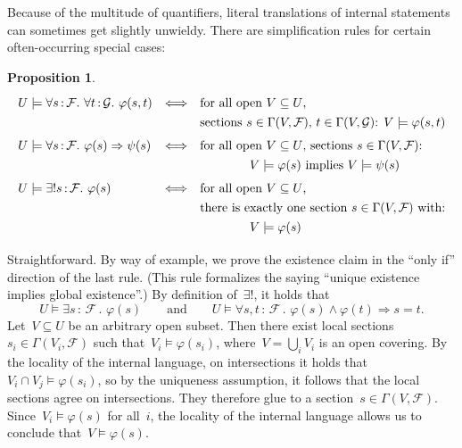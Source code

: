 \documentclass[10pt,reqno,a4paper]{amsbook}
\makeatletter
\theoremstyle{definition}
\theoremstyle{plain}
\newtheorem{prop}[defn]{Proposition}
\theoremstyle{remark}
\newcommand{\F}{\mathcal{F}}
\newcommand{\G}{\mathcal{G}}
\newcommand{\?}{\,{:}\,}
\renewcommand{\_}{\mathpunct{.}\,}
\renewenvironment{proof}[1][\proofname]{\par
  \pushQED{\qed}%
  \normalfont \topsep6\p@\@plus6\p@\relax
  \trivlist
  \item[\hskip\labelsep
        \itshape
    #1\@addpunct{.}]\ignorespaces
}{%
  \popQED\endtrivlist\@endpefalse
}
\makeatother
\begin{document}
Because of the multitude of quantifiers, literal translations of internal statements
can sometimes get slightly unwieldy. There are simplification rules for certain
often-occurring special cases:
\begin{prop}\label{prop:simplification}
    \[ \renewcommand{\arraystretch}{1.3}\begin{array}{@{}lcl@{}}
      U \models \forall s\?\F\_ \forall t\?\G\_ \varphi(s,t)
      &\Longleftrightarrow&
      \text{for all open~$V \subseteq U$,} \\
      && \text{sections~$s \in \Gamma(V,\F)$, $t \in \Gamma(V,\G)$:
      $V \models \varphi(s,t)$} \\[0.3em]
      U \models \forall s\?\F\_ \varphi(s) \Rightarrow \psi(s)
      &\Longleftrightarrow&
      \text{for all open~$V \subseteq U$, sections~$s \in \Gamma(V,\F)$:} \\
      &&\qquad\qquad \text{$V \models \varphi(s)$ implies $V \models \psi(s)$}
      \\[0.3em]
      U \models \exists!s\?\F\_ \varphi(s)
      &\Longleftrightarrow&
      \text{for all open~$V \subseteq U$,} \\
      &&
      \text{there is exactly one section~$s \in \Gamma(V,\F)$ with:} \\
      &&\qquad\qquad V \models \varphi(s)
    \end{array} \]
\end{prop}
\begin{proof}Straightforward. By way of example, we prove the existence claim
in the ``only if'' direction of the last rule. (This rule formalizes
the saying ``unique existence implies global existence''.) By definition of~$\exists!$, it
holds that
\[ U \models \exists s\?\F\_ \varphi(s)
  \qquad\text{and}\qquad
  U \models \forall s,t\?\F\_ \varphi(s) \wedge \varphi(t) \Rightarrow s = t. \]
Let~$V \subseteq U$ be an arbitrary open subset. Then there exist local
sections~$s_i \in \Gamma(V_i,\F)$ such that~$V_i \models \varphi(s_i)$, where~$V
= \bigcup_i V_i$ is an open covering. By the locality of the internal language,
on intersections it holds that~$V_i \cap V_j \models \varphi(s_i)$, so by the
uniqueness assumption, it follows that the local sections agree on intersections.
They therefore glue to a section~$s \in \Gamma(V,\F)$. Since~$V_i \models
\varphi(s)$ for all~$i$, the locality of the internal language allows us to
conclude that~$V \models \varphi(s)$.
\end{proof}
\end{document}
